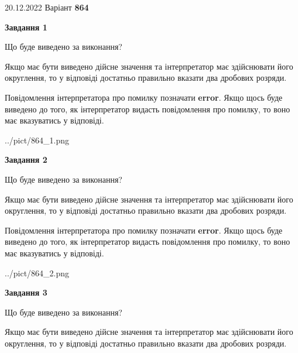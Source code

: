 \documentclass[12pt, ukrainian]{article}
\begin{document}
{20.12.2022 Варіант \No \textbf { 864 }\par}
{
\begin {Large}

{\begin {center}\textbf{Завдання 1}\end {center}}\par
Що буде виведено за виконання? \par

Якщо має бути виведено дійсне значення та інтерпретатор має здійснювати його округлення, 
то у відповіді достатньо правильно вказати два дробових розряди.

Повідомлення інтерпретатора про помилку позначати \textbf{error}.
Якщо щось буде виведено до того, як інтерпретатор видасть повідомлення про помилку, 
то воно має вказуватись у відповіді. \par

\begin{center}
	{../pict/864_1.png}
\end{center}
\newpage

{\begin {center}\textbf{Завдання 2}\end {center}}\par
Що буде виведено за виконання? \par

Якщо має бути виведено дійсне значення та інтерпретатор має здійснювати його округлення, 
то у відповіді достатньо правильно вказати два дробових розряди.

Повідомлення інтерпретатора про помилку позначати \textbf{error}.
Якщо щось буде виведено до того, як інтерпретатор видасть повідомлення про помилку, 
то воно має вказуватись у відповіді. \par

\begin{center}
	{../pict/864_2.png}
\end{center}
\newpage

{\begin {center}\textbf{Завдання 3}\end {center}}\par
Що буде виведено за виконання? \par

Якщо має бути виведено дійсне значення та інтерпретатор має здійснювати його округлення, 
то у відповіді достатньо правильно вказати два дробових розряди.


\end{Large}}
\end{document}
